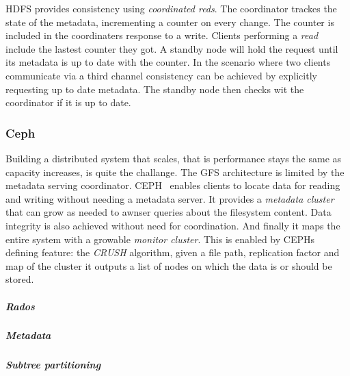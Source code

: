 \textsc{HDFS} provides consistency using \textit{coordinated reds}. The coordinator trackes the state of the metadata, incrementing a counter on every change. The counter is included in the coordinaters response to a write. Clients performing a \textit{read} include the lastest counter they got. A standby node will hold the request until its metadata is up to date with the counter. In the scenario where two clients communicate via a third channel consistency can be achieved by explicitly requesting up to date metadata. The standby node then checks wit the coordinator if it is up to date.

\subsubsection*{Ceph}
Building a distributed system that scales, that is performance stays the same as capacity increases, is quite the challange. The \textsc{GFS} architecture is limited by the metadata serving coordinator. \textsc{CEPH}~\cite{ceph} enables clients to locate data for reading and writing without needing a metadata server. It provides a \textit{metadata cluster} that can grow as needed to awnser queries about the filesystem content. Data integrity is also achieved without need for coordination. And finally it maps the entire system with a growable \textit{monitor cluster}. This is enabled by \textsc{CEPH}s defining feature: the \emph{CRUSH} algorithm, given a file path, replication factor and map of the cluster it outputs a list of nodes on which the data is or should be stored.

\subparagraph{Rados}
\subparagraph{Metadata}
\subparagraph{Subtree partitioning}
